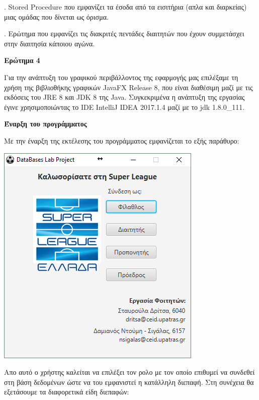 \documentclass[a4paper,oneside,titlepage,11pt]{article}
\begin{document}
. Stored Procedure που εμφανίζει τα έσοδα από τα εισιτήρια (απλα και διαρκείας) μιας ομάδας που δίνεται ως όρισμα.

\vspace{0.3cm}

. Ερώτημα που εμφανίζει τις διακριτές πεντάδες διαιτητών που έχουν συμμετάσχει στην διαιτησία κάποιου αγώνα.

\vspace{0.3cm}

\newpage

\noindent\textbf{Ερώτημα 4} 
\vspace{0.3cm}

\noindent Για την ανάπτυξη του γραφικού περιβάλλοντος της εφαρμογής μας επιλέξαμε τη χρήση της βιβλιοθήκης γραφικών JavaFX Release 8, που είναι διαθέσιμη μαζί με τις εκδόσεις του JRE 8 και JDK 8 της Java. Συγκεκριμένα η ανάπτυξη της εργασίας έγινε χρησιμοποιώντας το IDE IntelliJ IDEA 2017.1.4 μαζί με το jdk 1.8.0\_111.

\vspace{0.3cm}
\noindent\textbf{Έναρξη του προγράμματος} 
\vspace{0.3cm}

\noindent Με την έναρξη της εκτέλεσης του προγράμματος εμφανίζεται το εξής παράθυρο:

\begin{center}
 \includegraphics[scale=1]{screens/1_start.PNG} 
\end{center} 

\noindent Απο αυτό ο χρήστης καλείται να επιλέξει τον ρολο με τον οποίο επιθυμεί να συνδεθεί στη βάση δεδομένων ώστε να του εμφανιστεί η κατάλληλη διεπαφή. Στη συνέχεια θα εξετάσουμε τα διαφορετικά είδη διεπαφών:
\end{document}
